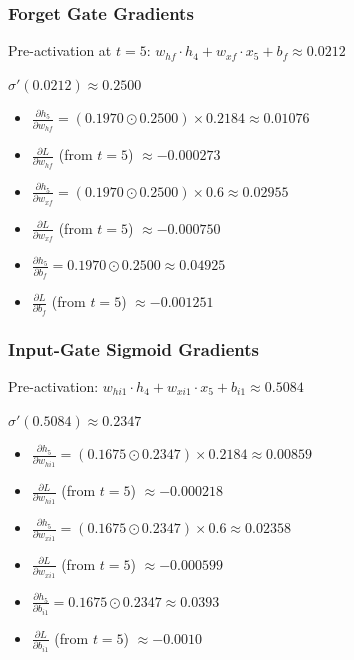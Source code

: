 \documentclass[12pt]{article}
\begin{document}
\subsubsection*{Forget Gate Gradients}

Pre-activation at $t=5$: $w_{hf} \cdot h_4 + w_{xf} \cdot x_5 + b_f \approx 0.0212$

$\sigma'(0.0212) \approx 0.2500$

\begin{itemize}[leftmargin=*]
    \item $\frac{\partial h_5}{\partial w_{hf}} = (0.1970 \odot 0.2500) \times 0.2184 \approx 0.01076$
    \item $\frac{\partial L}{\partial w_{hf}}$ (from $t=5$) $\approx -0.000273$

    \item $\frac{\partial h_5}{\partial w_{xf}} = (0.1970 \odot 0.2500) \times 0.6 \approx 0.02955$
    \item $\frac{\partial L}{\partial w_{xf}}$ (from $t=5$) $\approx -0.000750$

    \item $\frac{\partial h_5}{\partial b_f} = 0.1970 \odot 0.2500 \approx 0.04925$
    \item $\frac{\partial L}{\partial b_f}$ (from $t=5$) $\approx -0.001251$
\end{itemize}

\subsubsection*{Input-Gate Sigmoid Gradients}

Pre-activation: $w_{hi1} \cdot h_4 + w_{xi1} \cdot x_5 + b_{i1} \approx 0.5084$

$\sigma'(0.5084) \approx 0.2347$

\begin{itemize}[leftmargin=*]
    \item $\frac{\partial h_5}{\partial w_{hi1}} = (0.1675 \odot 0.2347) \times 0.2184 \approx 0.00859$
    \item $\frac{\partial L}{\partial w_{hi1}}$ (from $t=5$) $\approx -0.000218$

    \item $\frac{\partial h_5}{\partial w_{xi1}} = (0.1675 \odot 0.2347) \times 0.6 \approx 0.02358$
    \item $\frac{\partial L}{\partial w_{xi1}}$ (from $t=5$) $\approx -0.000599$

    \item $\frac{\partial h_5}{\partial b_{i1}} = 0.1675 \odot 0.2347 \approx 0.0393$
    \item $\frac{\partial L}{\partial b_{i1}}$ (from $t=5$) $\approx -0.0010$
\end{itemize}
\end{document}
